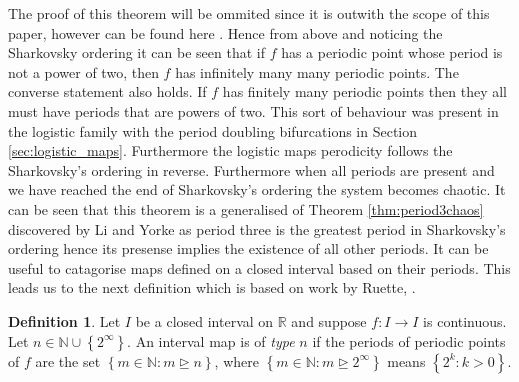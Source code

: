 \documentclass[11pt,a4paper,oneside]{memoir}
\theoremstyle{plain}
\theoremstyle{definition}
\newtheorem{defn}[thm]{Definition}
\begin{document}
The proof of this theorem will be ommited since it is outwith the scope of this paper, however can be found here \cite{sharkovsky}. Hence from above and noticing the Sharkovsky ordering it can be seen that if $f$ has a periodic point whose period is not a power of two, then $f$ has infinitely many many periodic points. The converse statement also holds. If $f$ has finitely many periodic points then they all must have periods that are powers of two. This sort of behaviour was present in the logistic family with the period doubling bifurcations in Section \ref{sec:logistic_maps}. Furthermore the logistic maps perodicity follows the Sharkovsky's ordering in reverse. Furthermore when all periods are present and we have reached the end of Sharkovsky's ordering the system becomes chaotic. It can be seen that this theorem is a generalised of Theorem \ref{thm:period3chaos} discovered by Li and Yorke \cite{li-yorke} as period three is the greatest period in Sharkovsky's ordering hence its presense implies the existence of all other periods. It can be useful to catagorise maps defined on a closed interval based on their periods. This leads us to the next definition which is based on work by Ruette, \cite[Section 3.3]{ruette}.

\begin{defn} \label{def:type}
    Let $I$ be a closed interval on $\mathbb{R}$ and suppose $f: I \to I$ is continuous. Let $n \in \mathbb{N} \cup \left\lbrace 2^{\infty} \right\rbrace$. An interval map is of \emph{type} $n$ if the periods of periodic points of $f$ are the set $\left\lbrace m \in \mathbb{N} : m \unrhd n \right\rbrace$, where $\left\lbrace m \in \mathbb{N} : m \unrhd 2^\infty \right\rbrace$ means $\left\lbrace 2^k : k > 0 \right\rbrace$.
\end{defn}
\end{document}
